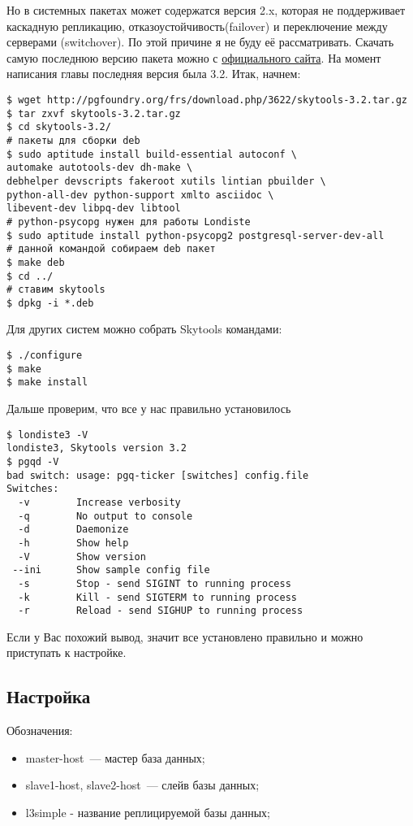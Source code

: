 Но в системных пакетах может содержатся версия 2.x, которая не поддерживает каскадную репликацию, отказоустойчивость(failover) и переключение между серверами (switchover). По этой причине я не буду её рассматривать. Скачать самую последнюю версию пакета можно с \href{http://pgfoundry.org/projects/skytools}{официального сайта}.
На момент написания главы последняя версия была 3.2. Итак, начнем:

\begin{lstlisting}[label=lst:londiste2,caption=Установка]
$ wget http://pgfoundry.org/frs/download.php/3622/skytools-3.2.tar.gz
$ tar zxvf skytools-3.2.tar.gz
$ cd skytools-3.2/
# пакеты для сборки deb
$ sudo aptitude install build-essential autoconf \
automake autotools-dev dh-make \
debhelper devscripts fakeroot xutils lintian pbuilder \
python-all-dev python-support xmlto asciidoc \
libevent-dev libpq-dev libtool
# python-psycopg нужен для работы Londiste
$ sudo aptitude install python-psycopg2 postgresql-server-dev-all
# данной командой собираем deb пакет
$ make deb
$ cd ../
# ставим skytools
$ dpkg -i *.deb
\end{lstlisting}

Для других систем можно собрать Skytools командами:

\begin{lstlisting}[label=lst:londiste3,caption=Установка]
$ ./configure
$ make
$ make install
\end{lstlisting}

Дальше проверим, что все у нас правильно установилось
\begin{lstlisting}[label=lst:londiste4,caption=Установка]
$ londiste3 -V
londiste3, Skytools version 3.2
$ pgqd -V
bad switch: usage: pgq-ticker [switches] config.file
Switches:
  -v        Increase verbosity
  -q        No output to console
  -d        Daemonize
  -h        Show help
  -V        Show version
 --ini      Show sample config file
  -s        Stop - send SIGINT to running process
  -k        Kill - send SIGTERM to running process
  -r        Reload - send SIGHUP to running process
\end{lstlisting}

Если у Вас похожий вывод, значит все установлено правильно и можно приступать к настройке.


\subsection{Настройка}

Обозначения:
\begin{itemize}
  \item master-host~--- мастер база данных;
  \item slave1-host, slave2-host~--- слейв базы данных;
  \item l3simple - название реплицируемой базы данных;
\end{itemize}

